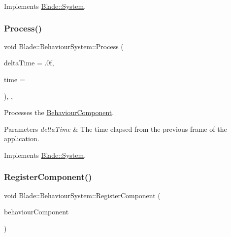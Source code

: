 Implements \hyperlink{class_blade_1_1_system_a63fa00af40dc54d093300eff4785f26f}{Blade\+::\+System}.

\mbox{\label{class_blade_1_1_behaviour_system_af233e62b0ee7a43a419069d6de557343}} 
\subsubsection{\texorpdfstring{Process()}{Process()}}
{\footnotesize\ttfamily void Blade\+::\+Behaviour\+System\+::\+Process (\begin{DoxyParamCaption}\item[{float}]{delta\+Time = {\ttfamily .0f},  }\item[{long}]{time = {} }\end{DoxyParamCaption})\hspace{0.3cm}{\ttfamily [override]}, {\ttfamily [virtual]}, {\ttfamily [noexcept]}}



Processes the \hyperlink{class_blade_1_1_behaviour_component}{Behaviour\+Component}. 


\begin{DoxyParams}{Parameters}
{\em delta\+Time} & The time elapsed from the previous frame of the application. \\
\hline
\end{DoxyParams}


Implements \hyperlink{class_blade_1_1_system_a80c186f5f9f8fa4fd317b861853fe6a8}{Blade\+::\+System}.

\mbox{\label{class_blade_1_1_behaviour_system_aafcc2463979e3442abb93c086b4d0cbc}} 
\subsubsection{\texorpdfstring{Register\+Component()}{RegisterComponent()}}
{\footnotesize\ttfamily void Blade\+::\+Behaviour\+System\+::\+Register\+Component (\begin{DoxyParamCaption}\item[{\hyperlink{class_blade_1_1_behaviour_component}{Behaviour\+Component} $\ast$}]{behaviour\+Component }\end{DoxyParamCaption})\hspace{0.3cm}{\ttfamily [noexcept]}}



